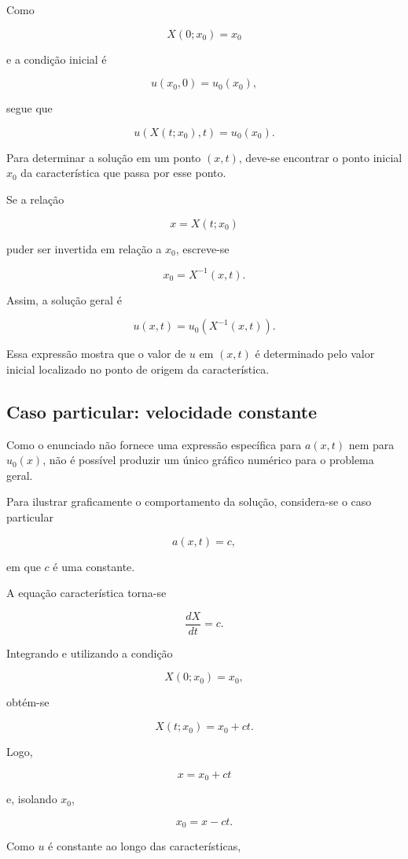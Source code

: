 \documentclass[
    12pt,
    oneside,
    a4paper,
    english,
    brazilian,
    chapter=TITLE,
    sumario=tradicional
]{abntex2}
\begin{document}
Como

\[
    X(0;x_0)=x_0
\]

e a condição inicial é

\[
    u(x_0,0)=u_0(x_0),
\]

segue que

\[
    u(X(t;x_0),t)=u_0(x_0).
\]

Para determinar a solução em um ponto $(x,t)$, deve-se encontrar o ponto
inicial $x_0$ da característica que passa por esse ponto.

Se a relação

\[
    x=X(t;x_0)
\]

puder ser invertida em relação a $x_0$, escreve-se

\[
    x_0=X^{-1}(x,t).
\]

Assim, a solução geral é

\[
    \boxed{
        u(x,t)=u_0\left(X^{-1}(x,t)\right)
    }.
\]

Essa expressão mostra que o valor de $u$ em $(x,t)$ é determinado pelo valor
inicial localizado no ponto de origem da característica.

\subsection{Caso particular: velocidade constante}

Como o enunciado não fornece uma expressão específica para $a(x,t)$ nem para
$u_0(x)$, não é possível produzir um único gráfico numérico para o problema
geral.

Para ilustrar graficamente o comportamento da solução, considera-se o caso
particular

\[
    a(x,t)=c,
\]

em que $c$ é uma constante.

A equação característica torna-se

\[
    \frac{dX}{dt}=c.
\]

Integrando e utilizando a condição

\[
    X(0;x_0)=x_0,
\]

obtém-se

\[
    X(t;x_0)=x_0+ct.
\]

Logo,

\[
    x=x_0+ct
\]

e, isolando $x_0$,

\[
    x_0=x-ct.
\]

Como $u$ é constante ao longo das características,
\end{document}
